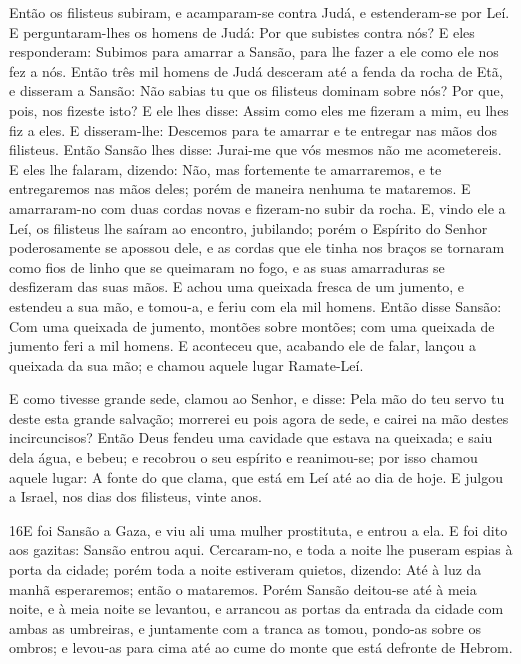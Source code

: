 Então os filisteus subiram, e acamparam-se contra Judá, e
estenderam-se por Leí. E per\-gun\-ta\-ram-lhes os homens de Judá:
Por que subistes contra nós? E eles responderam: Subimos para
amarrar a Sansão, para lhe fazer a ele como ele nos fez a nós.
Então três mil homens de Judá desceram até a fenda da rocha
de Etã, e disseram a Sansão: Não sabias tu que os filisteus dominam
sobre nós? Por que, pois, nos fizeste isto? E ele lhes disse: Assim
como eles me fizeram a mim, eu lhes fiz a eles. E
disseram-lhe: Descemos para te amarrar e te entregar nas mãos dos
filisteus. Então Sansão lhes disse: Jurai-me que vós mesmos não me
acometereis. E eles lhe falaram, dizendo: Não, mas fortemente
te amarraremos, e te entregaremos nas mãos deles; porém de maneira
nenhuma te mataremos. E amarraram-no com duas cordas novas e
fizeram-no subir da rocha. E, vindo ele a Leí, os filisteus
lhe saíram ao encontro, jubilando; porém o Espírito do Senhor
poderosamente se apossou dele, e as cordas que ele tinha nos braços
se tornaram como fios de linho que se queimaram no fogo, e as suas
amarraduras se desfizeram das suas mãos. E achou uma queixada
fresca de um jumento, e estendeu a sua mão, e tomou-a, e feriu com
ela mil homens. Então disse Sansão: Com uma queixada de
jumento, montões sobre montões; com uma queixada de jumento feri a
mil homens. E aconteceu que, acabando ele de falar, lançou a
queixada da sua mão; e chamou aquele lugar Ramate-Leí.

E como tivesse grande sede, clamou ao Senhor, e disse: Pela mão
do teu servo tu deste esta grande salvação; morrerei eu pois agora
de sede, e cairei na mão destes incircuncisos? Então Deus
fendeu uma cavidade que estava na queixada; e saiu dela água, e
bebeu; e recobrou o seu espírito e reanimou-se; por isso chamou
aquele lugar: A fonte do que clama, que está em Leí até ao dia de
hoje. E julgou a Israel, nos dias dos filisteus, vinte anos.

\medskip

\lettrine{16} E foi Sansão a Gaza, e viu ali uma mulher
prostituta, e entrou a ela. E foi dito aos gazitas: Sansão
entrou aqui. Cercaram-no, e toda a noite lhe puseram espias à porta
da cidade; porém toda a noite estiveram quietos, dizendo: Até à luz
da manhã esperaremos; então o mataremos. Porém Sansão deitou-se
até à meia noite, e à meia noite se levantou, e arrancou as portas
da entrada da cidade com ambas as umbreiras, e juntamente com a
tranca as tomou, pondo-as sobre os ombros; e levou-as para cima até
ao cume do monte que está defronte de Hebrom.

